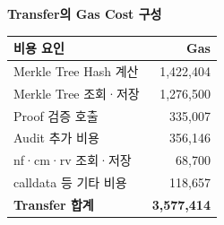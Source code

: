 \textbf{Transfer의 Gas Cost 구성}\par\smallskip
\begin{tabular}{@{}lr@{}}\toprule
    \textbf{비용 요인}       & \textbf{Gas}       \\
    \midrule
    Merkle Tree Hash 계산  & 1,422,404          \\
    Merkle Tree 조회·저장    & 1,276,500          \\
    Proof 검증 호출          & 335,007            \\
    Audit 추가 비용          & 356,146            \\
    nf·cm·rv 조회·저장       & 68,700             \\
    calldata 등 기타 비용     & 118,657            \\
    \midrule
    \textbf{Transfer 합계} & \textbf{3,577,414} \\
    \bottomrule
\end{tabular}\par\smallskip
